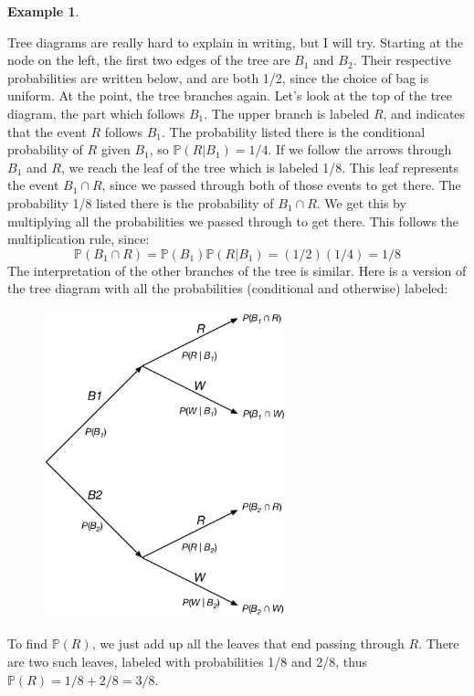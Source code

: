 \documentclass[12pt]{article}
\theoremstyle{definition}
\newtheorem*{example}{Example}
\theoremstyle{remark}
\def\P{{\mathbb P}}
\begin{document}
\begin{example}
\begin{enumerate}
Tree diagrams are really hard to explain in writing, but I will try. Starting at the node on the left, the first two edges of the tree are $B_1$ and $B_2$. Their respective probabilities are written below, and are both 1/2, since the choice of bag is uniform. At the point, the tree branches again. Let's look at the top of the tree diagram, the part which follows $B_1$. The upper branch is labeled $R$, and indicates that the event $R$ follows $B_1$. The probability listed there is the conditional probability of $R$ given $B_1$, so $\P(R|B_1) = 1/4$. If we follow the arrows through $B_1$ and $R$, we reach the leaf of the tree which is labeled 1/8. This leaf represents the event $B_1 \cap R$, since we passed through both of those events to get there. The probability 1/8 listed there is the probability of $B_1 \cap R$. We get this by multiplying all the probabilities we passed through to get there. This follows the multiplication rule, since:
\[
\P(B_1 \cap R) = \P(B_1)\P(R|B_1) = (1/2)(1/4) = 1/8
\]
The interpretation of the other branches of the tree is similar. Here is a version of the tree diagram with all the probabilities (conditional and otherwise) labeled: 
\begin{figure}[H]
\centering
\includegraphics[width=7cm]{tree2.eps}
\end{figure}

To find $\P(R)$, we just add up all the leaves that end passing through $R$. There are two such leaves, labeled with probabilities 1/8 and 2/8, thus $\P(R) = 1/8 + 2/8 = 3/8$.\\


\end{enumerate}
\end{example}
\end{document}

